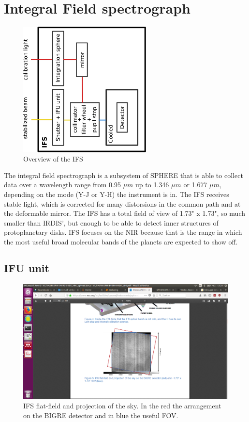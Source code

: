 \documentclass[twoside,single]{lion-msc}
\begin{document}
\section{Integral Field spectrograph}
\begin{figure}[htbp]
\centering 
\includegraphics[trim={13cm 5cm 10cm 7cm},clip,width = 0.6\textwidth]{overviewIFS}
\caption{Overview of the IFS\cite{Observatory2007}} 
\label{}
\end{figure}

The integral field spectrograph is a subsystem of SPHERE that is able to collect data over a wavelength range from 0.95 $\mu m$ up to 1.346 $\mu m$ or 1.677 $\mu m$, depending on the mode (Y-J or Y-H) the instrument is in. The IFS receives stable light, which is corrected for many distorsions in the common path and at the deformable mirror. The IFS has a total field of view of 1.73" x 1.73", so much smaller than IRDIS', but enough to be able to detect inner structures of protoplanetary disks. IFS focuses on the NIR because that is the range in which the most useful broad molecular bands of the planets are expected to show off.

\subsection{IFU unit}
\begin{figure}
\centering 
\includegraphics[trim={15cm 5.5cm 10cm 9.5cm},clip,scale = 0.47]{biggre}
\caption{IFS flat-field and projection of the sky. In the red the arrangement on the BIGRE detector and in blue the useful FOV. \citep{Observatory2007}} 
\label{fig:bigre}
\end{figure}
\end{document}
